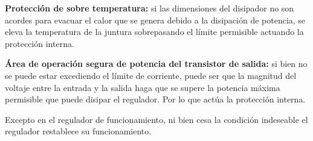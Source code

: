 \sangria{} \textbf{Protección de sobre temperatura:} si las dimensiones del disipador no son acordes para evacuar el calor que se genera debido a la disipación de potencia, se eleva la temperatura de la juntura sobrepasando el límite permisible
actuando la protección interna.

\sangria{} \textbf{Área de operación segura de potencia del transistor de salida:} si
bien no se puede estar excediendo el límite de corriente, puede ser que la
magnitud del voltaje entre la entrada y la salida haga que se supere la potencia máxima permisible que puede disipar el regulador. Por lo que actúa la protección interna.

\sangria{} Excepto en el regulador de funcionamiento, ni bien cesa la condición
indeseable el regulador restablece su funcionamiento.
